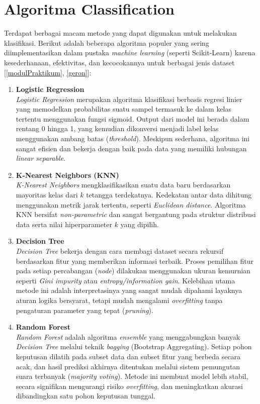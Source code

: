 \documentclass[a4paper,oneside,11pt]{book}
\begin{document}
\section{Algoritma Classification}
Terdapat berbagai macam metode yang dapat digunakan untuk melakukan klasifikasi. Berikut adalah beberapa algoritma populer yang sering diimplementasikan dalam pustaka \textit{machine learning} (seperti Scikit-Learn) karena kesederhanaan, efektivitas, dan kecocokannya untuk berbagai jenis dataset [\ref{modulPraktikum}, \ref{geron}]:

\begin{enumerate}
    \item \textbf{Logistic Regression}\\
    \textit{Logistic Regression} merupakan algoritma klasifikasi berbasis regresi linier yang memodelkan probabilitas suatu sampel termasuk ke dalam kelas tertentu menggunakan fungsi sigmoid. Output dari model ini berada dalam rentang 0 hingga 1, yang kemudian dikonversi menjadi label kelas menggunakan ambang batas (\textit{threshold}). Meskipun sederhana, algoritma ini sangat efisien dan bekerja dengan baik pada data yang memiliki hubungan \textit{linear separable}.

    \item \textbf{K-Nearest Neighbors (KNN)}\\
    \textit{K-Nearest Neighbors} mengklasifikasikan suatu data baru berdasarkan mayoritas kelas dari $k$ tetangga terdekatnya. Kedekatan antar data dihitung menggunakan metrik jarak tertentu, seperti \textit{Euclidean distance}. Algoritma KNN bersifat \textit{non-parametric} dan sangat bergantung pada struktur distribusi data serta nilai hiperparameter $k$ yang dipilih.

    \item \textbf{Decision Tree}\\
    \textit{Decision Tree} bekerja dengan cara membagi dataset secara rekursif berdasarkan fitur yang memberikan informasi terbaik. Proses pemilihan fitur pada setiap percabangan (\textit{node}) dilakukan menggunakan ukuran kemurnian seperti \textit{Gini impurity} atau \textit{entropy/information gain}. Kelebihan utama metode ini adalah interpretasinya yang sangat mudah dipahami layaknya aturan logika bersyarat, tetapi mudah mengalami \textit{overfitting} tanpa pengaturan parameter yang tepat (\textit{pruning}).

    \item \textbf{Random Forest}\\
    \textit{Random Forest} adalah algoritma \textit{ensemble} yang menggabungkan banyak \textit{Decision Tree} melalui teknik \textit{bagging} (Bootstrap Aggregating). Setiap pohon keputusan dilatih pada subset data dan subset fitur yang berbeda secara acak, dan hasil prediksi akhirnya ditentukan melalui sistem pemungutan suara terbanyak (\textit{majority voting}). Metode ini membuat model lebih stabil, secara signifikan mengurangi risiko \textit{overfitting}, dan meningkatkan akurasi dibandingkan satu pohon keputusan tunggal.


\end{enumerate}
\end{document}
